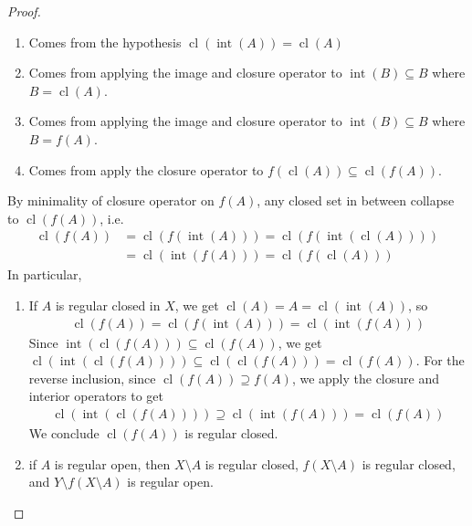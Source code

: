 \documentclass{treatise}
\begin{document}
\begin{proof}
\begin{enumerate}[label=(\alph*)]
\begin{enumerate}[label=(\roman*)]
        \item Comes from the hypothesis $\operatorname{cl}(\operatorname{int}(A)) = \operatorname{cl}(A)$
        \item Comes from applying the image and closure operator to $\operatorname{int}(B) \subseteq B$ where $B = \operatorname{cl}(A)$.
        \item Comes from applying the image and closure operator to $\operatorname{int}(B) \subseteq B$ where $B = f(A)$.
        \item Comes from apply the closure operator to $f(\operatorname{cl}(A)) \subseteq \operatorname{cl}(f(A))$.
    \end{enumerate}
    By minimality of closure operator on $f(A)$, any closed set in between collapse to $\operatorname{cl}(f(A))$, i.e.
    \begin{align*}
        \operatorname{cl}(f(A)) & = \operatorname{cl}(f(\operatorname{int}(A))) = \operatorname{cl}(f(\operatorname{int}(\operatorname{cl}(A))))
        \\
        & = \operatorname{cl}(\operatorname{int}(f(A))) = \operatorname{cl}(f(\operatorname{cl}(A)))
    \end{align*}
    In particular,
    \begin{enumerate}[label=(\roman*)]
        \item If $A$ is regular closed in $X$, we get $\operatorname{cl}(A) = A = \operatorname{cl}(\operatorname{int}(A))$, so
        \begin{gather*}
            \operatorname{cl}(f(A)) = \operatorname{cl}(f(\operatorname{int}(A))) = \operatorname{cl}(\operatorname{int}(f(A)))
        \end{gather*}
        Since $\operatorname{int}(\operatorname{cl}(f(A))) \subseteq \operatorname{cl}(f(A))$, we get $\operatorname{cl}(\operatorname{int}(\operatorname{cl}(f(A)))) \subseteq \operatorname{cl}(\operatorname{cl}(f(A))) = \operatorname{cl}(f(A))$. For the reverse inclusion, since $\operatorname{cl}(f(A)) \supseteq f(A)$, we apply the closure and interior operators to get
        \begin{align*}
            \operatorname{cl}(\operatorname{int}(\operatorname{cl}(f(A)))) \supseteq \operatorname{cl}(\operatorname{int}(f(A))) = \operatorname{cl}(f(A))
        \end{align*}
        We conclude $\operatorname{cl}(f(A))$ is regular closed.
        \item if $A$ is regular open, then $X \setminus A$ is regular closed, $f(X \setminus A)$ is regular closed, and $Y \setminus f(X \setminus A)$ is regular open.
    \end{enumerate}
\end{enumerate}
\end{proof}
\end{document}
